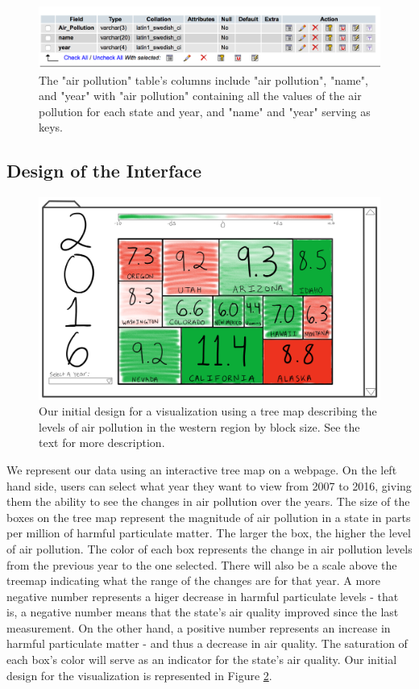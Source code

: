 \documentclass[journal]{vgtc}                %
\begin{document}
\begin{figure}
\centering
\includegraphics[width=\columnwidth]{air_poll_db.png}
\caption{The "air pollution" table's columns include "air pollution", "name", and "year" with "air pollution" 
containing all the values of the air pollution for each state and year, and "name" and "year" serving as keys.}
\label{fig:airPoll}
\end{figure}

\subsection{Design of the Interface}

\begin{figure}[h!]
\centering
\includegraphics[width=\columnwidth]{HW1Design.PNG}
\caption{Our initial design for a visualization using a tree map describing the levels of air pollution in the western region by block size. See the text for more description.}
\label{fig:Design}
\end{figure}

We represent our data using an interactive tree map on a webpage. On the left hand side, users can select what year 
they want to view from 2007 to 2016, giving them the ability to see the changes in air pollution over the years. The 
size of the boxes on the tree map represent the magnitude of air pollution in a state in parts per million of harmful particulate matter. The larger the 
box, the higher the level of air pollution. The color of each box represents the change in air pollution levels from the previous 
year to the one selected. There will also be a scale above the treemap indicating what the range of the changes are for that year. 
A more negative number represents a higer decrease in harmful particulate levels - that is, a negative number means
that the state's air quality improved since the last measurement. On the other hand, a positive number represents an increase in harmful
particulate matter - and thus a decrease in air quality. The saturation of each box's color will serve as an indicator for the state's 
air quality. Our initial design for the visualization is represented in Figure \ref{fig:Design}.
\end{document}
